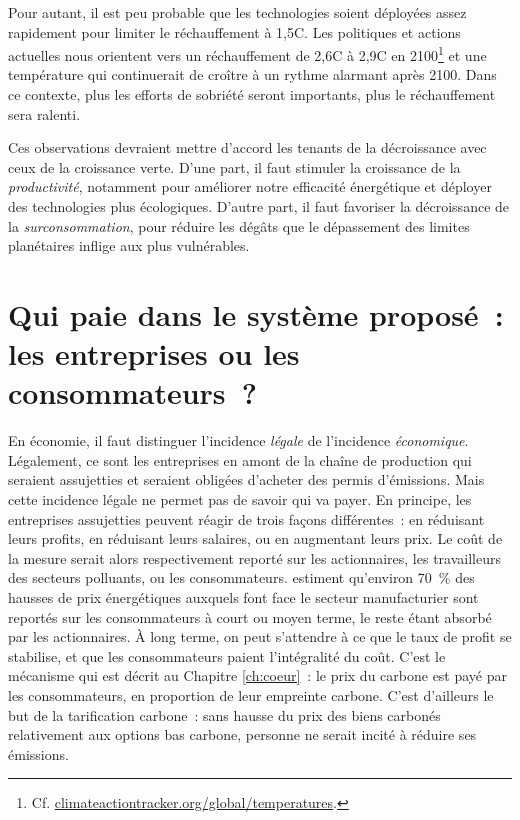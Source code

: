 \documentclass[a5paper,french,openany]{memoir}
\begin{document}
Pour autant, il est peu probable que les technologies soient déployées assez rapidement pour limiter le réchauffement à 1,5\textdegree{}C. Les politiques et actions 
actuelles nous orientent vers un réchauffement de 2,6\textdegree{}C à 2,9\textdegree{}C en 2100\footnote{Cf. \href{https://climateactiontracker.org/global/temperatures/}{climateactiontracker.org/global/temperatures}.} et une température qui continuerait de croître à un rythme alarmant après 2100. Dans ce contexte, plus les efforts de sobriété seront importants, plus le réchauffement sera ralenti. 

Ces observations devraient mettre d'accord les tenants de la décroissance avec ceux de la croissance verte. D'une part, il faut stimuler la croissance de la \textit{productivité}, notamment pour améliorer notre efficacité énergétique et déployer des technologies plus écologiques. D'autre part, il faut favoriser la décroissance de la \textit{surconsommation}, pour réduire les dégâts que le dépassement des limites planétaires inflige aux plus vulnérables. 

\section*{\normalsize Qui paie dans le système proposé~: les entreprises ou les consommateurs~?}\label{q:incidence}

En économie, il faut distinguer l'incidence \textit{légale} de l'incidence \textit{économique}. Légalement, ce sont les entreprises en amont de la chaîne de production qui seraient assujetties et seraient obligées d'acheter des permis d'émissions. Mais cette incidence légale ne permet pas de savoir qui va payer. En principe, les entreprises assujetties peuvent réagir de trois façons différentes~: en réduisant leurs profits, en réduisant leurs salaires, ou en augmentant leurs prix. Le coût de la mesure serait alors respectivement reporté sur les actionnaires, les travailleurs des secteurs polluants, ou les consommateurs. \cite{ganapati_energy_2020} estiment qu'environ 70~\% des hausses de prix énergétiques auxquels font face le secteur manufacturier sont reportés sur les consommateurs à court ou moyen terme, le reste étant absorbé par les actionnaires. À long terme, on peut s'attendre à ce que le taux de profit se stabilise, et que les consommateurs paient l'intégralité du coût. C'est le mécanisme qui est décrit au Chapitre \ref{ch:coeur}~: le prix du carbone est payé par les consommateurs, en proportion de leur empreinte carbone. C'est d'ailleurs le but de la tarification carbone~: sans hausse du prix des biens carbonés relativement aux options bas carbone, personne ne serait incité à réduire ses émissions.
\end{document}
